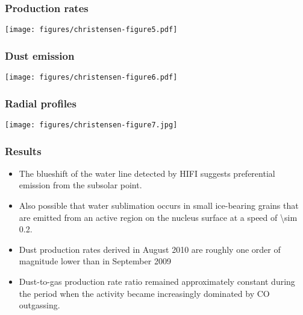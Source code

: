 \documentclass{beamer}
\begin{document}
\begin{frame}
\frametitle{Production rates}
\texttt{[image: figures/christensen-figure5.pdf]}
\end{frame}

\begin{frame}
\frametitle{Dust emission}
\texttt{[image: figures/christensen-figure6.pdf]}
\end{frame}

\begin{frame}
\frametitle{Radial profiles}
\texttt{[image: figures/christensen-figure7.jpg]}
\end{frame}

\begin{frame}
\frametitle{Results}
\begin{itemize}
  \item The blueshift of the water line detected by HIFI suggests
  preferential emission from the subsolar point.
  \item Also
  possible that water sublimation occurs in small ice-bearing grains
  that are emitted from an active region on the nucleus surface at a
  speed of \SI{\sim 0.2}{\kms}.
  \item Dust production rates derived in
  August 2010 are roughly one order of magnitude lower than in
  September 2009
  \item Dust-to-gas production rate
  ratio remained approximately constant during the period when the
  activity became increasingly dominated by CO outgassing.
\end{itemize}
\end{frame}
\end{document}
